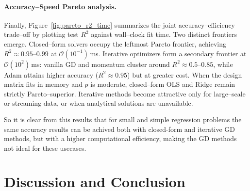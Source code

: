 \documentclass[
 reprint,            %
 amsmath,amssymb,
 aps,
]{revtex4-2}
\begin{document}
\paragraph*{Accuracy–Speed Pareto analysis.}
Finally, Figure~\ref{fig:pareto_r2_time} summarizes the joint accuracy–efficiency trade–off by plotting test $R^2$ against wall–clock fit time. 
Two distinct frontiers emerge\cite{bottou2010largeScaleSGD}.
Closed–form solvers occupy the leftmost Pareto frontier, achieving $R^2\approx0.95$–$0.99$ at $\mathcal{O}(10^{-1})$\,ms.  
Iterative optimizers form a secondary frontier at $\mathcal{O}(10^2)$\,ms: vanilla GD and momentum cluster around $R^2\approx0.5$–$0.85$, while Adam attains higher accuracy ($R^2\approx0.95$) but at greater cost. 
When the design matrix fits in memory and $p$ is moderate, closed–form OLS and Ridge remain strictly Pareto–superior. 
Iterative methods become attractive only for large–scale or streaming data, or when analytical solutions are unavailable.
% 


So it is clear from this results that for small and simple regression problems the same accuracy results can be achived both with closed-form and iterative GD methods, but with a higher computational efficiency, making the GD methods not ideal for these usecases.

\section{Discussion and Conclusion}
\end{document}
